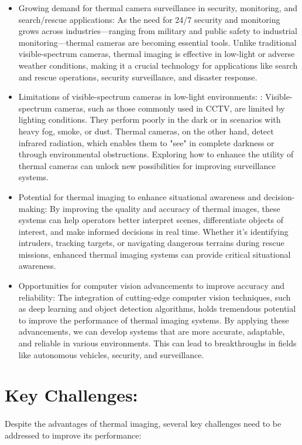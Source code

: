 \documentclass[11pt,a4paper]{report}
\begin{document}
\begin{itemize}
\item Growing demand for thermal camera surveillance in security, monitoring, and search/rescue applications: As the need for 24/7 security and monitoring grows across industries—ranging from military and public safety to industrial monitoring—thermal cameras are becoming essential tools. Unlike traditional visible-spectrum cameras, thermal imaging is effective in low-light or adverse weather conditions, making it a crucial technology for applications like search and rescue operations, security surveillance, and disaster response.
\item Limitations of visible-spectrum cameras in low-light environments: : Visible-spectrum cameras, such as those commonly used in CCTV, are limited by lighting conditions. They perform poorly in the dark or in scenarios with heavy fog, smoke, or dust. Thermal cameras, on the other hand, detect infrared radiation, which enables them to "see" in complete darkness or through environmental obstructions. Exploring how to enhance the utility of thermal cameras can unlock new possibilities for improving surveillance systems.
\item Potential for thermal imaging to enhance situational awareness and decision-making:  By improving the quality and accuracy of thermal images, these systems can help operators better interpret scenes, differentiate objects of interest, and make informed decisions in real time. Whether it's identifying intruders, tracking targets, or navigating dangerous terrains during rescue missions, enhanced thermal imaging systems can provide critical situational awareness.
\item Opportunities for computer vision advancements to improve accuracy and reliability: The integration of cutting-edge computer vision techniques, such as deep learning and object detection algorithms, holds tremendous potential to improve the performance of thermal imaging systems. By applying these advancements, we can develop systems that are more accurate, adaptable, and reliable in various environments. This can lead to breakthroughs in fields like autonomous vehicles, security, and surveillance.
\end{itemize}

\section{Key Challenges:}

\paragraph{ } Despite the advantages of thermal imaging, several key challenges need to be addressed to improve its performance:
\end{document}
